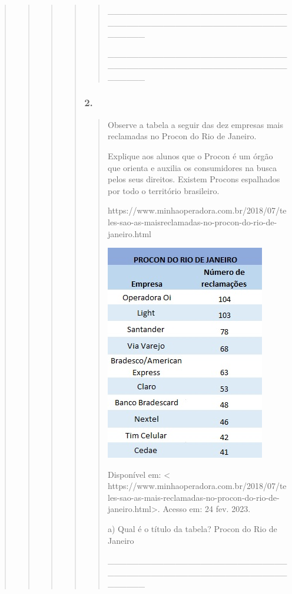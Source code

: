 \begin{quote}
\begin{quote}
\begin{quote}
\begin{quote}
\begin{quote}
\_\_\_\_\_\_\_\_\_\_\_\_\_\_\_\_\_\_\_\_\_\_\_\_\_\_\_\_\_\_\_\_\_\_\_\_\_\_\_\_\_\_\_\_\_\_\_\_\_\_\_\_\_\_\_\_\_\_\_\_\_\_\_\_

\_\_\_\_\_\_\_\_\_\_\_\_\_\_\_\_\_\_\_\_\_\_\_\_\_\_\_\_\_\_\_\_\_\_\_\_\_\_\_\_\_\_\_\_\_\_\_\_\_\_\_\_\_\_\_\_\_\_\_\_\_\_\_\_
\end{quote}

\subsubsection{2. }\label{section-67}

\begin{quote}
Observe a tabela a seguir das dez empresas mais reclamadas no Procon do
Rio de Janeiro.

Explique aos alunos que o Procon é um órgão que orienta e auxilia os
consumidores na busca pelos seus direitos. Existem Procons espalhados
por todo o território brasileiro.

https://www.minhaoperadora.com.br/2018/07/teles-sao-as-maisreclamadas-no-procon-do-rio-de-janeiro.html

\includegraphics[width=2.72917in,height=3.70833in]{media/image30.jpeg}

Disponível em: \protect\hypertarget{_Hlk128145216}{}{}\textless{}
https://www.minhaoperadora.com.br/2018/07/teles-sao-as-mais-reclamadas-no-procon-do-rio-de-janeiro.html\textgreater{}.
Acesso em: 24 fev. 2023.

a) Qual é o título da tabela? Procon do Rio de Janeiro

\_\_\_\_\_\_\_\_\_\_\_\_\_\_\_\_\_\_\_\_\_\_\_\_\_\_\_\_\_\_\_\_\_\_\_\_\_\_\_\_\_\_\_\_\_\_\_\_\_\_\_\_\_\_\_\_\_\_\_\_\_\_\_\_


\end{quote}
\end{quote}
\end{quote}
\end{quote}
\end{quote}
